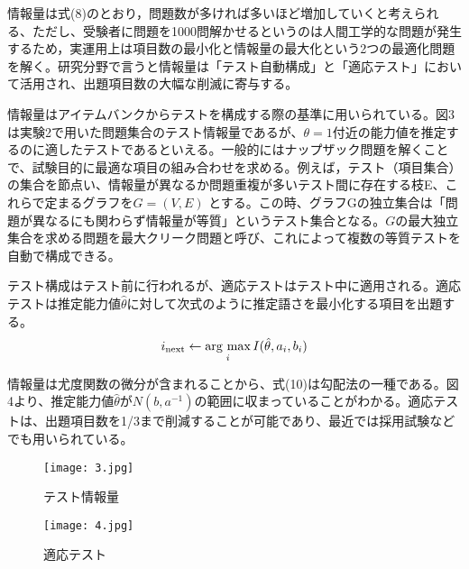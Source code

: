 \documentclass[12pt]{jarticle}
\begin{document}
情報量は式(8)のとおり，問題数が多ければ多いほど増加していくと考えられる、ただし、受験者に問題を1000問解かせるというのは人間工学的な問題が発生するため，実運用上は項目数の最小化と情報量の最大化という2つの最適化問題を解く。研究分野で言うと情報量は「テスト自動構成」と「適応テスト」において活用され、出題項目数の大幅な削滅に寄与する。

情報量はアイテムバンクからテストを構成する際の基準に用いられている。図3は実験2で用いた問題集合のテスト情報量であるが、$\theta=1$付近の能力値を推定するのに適したテストであるといえる。一般的にはナップザック問題を解くことで、試験目的に最適な項目の組み合わせを求める。例えば，テスト（項目集合）の集合を節点い、情報量が異なるか問題重複が多いテスト間に存在する枝E、これらで定まるグラフを$G = (V,E)$ とする。この時、グラフGの独立集合は「問題が異なるにも関わらず情報量が等質」というテスト集合となる。$G$の最大独立集合を求める問題を最大クリーク問題と呼び、これによって複数の等質テストを自動で構成できる。

テスト構成はテスト前に行われるが、適応テストはテスト中に適用される。適応テストは推定能力値$\hat{\theta}$に対して次式のように推定語さを最小化する項目を出題する。
\begin{equation}
i_{\rm{next}}\leftarrow \mathop{\rm arg~max}\limits_i I(\hat{\theta},a_i,b_i)
\end{equation}

情報量は尤度関数の微分が含まれることから、式(10)は勾配法の一種である。図4より、推定能力値$\hat{\theta}$が$N(b,a^{-1})$の範囲に収まっていることがわかる。適応テストは、出題項目数を1/3まで削減することが可能であり、最近では採用試験などでも用いられている。
\begin{figure}[H]
\centering
\begin{minipage}{0.45\linewidth}
	\centering
	\texttt{[image: 3.jpg]}
	\caption{テスト情報量}
\end{minipage}
\begin{minipage}{0.45\linewidth}
	\centering
	\texttt{[image: 4.jpg]}
	\caption{適応テスト}
\end{minipage}
\end{figure}
\end{document}
